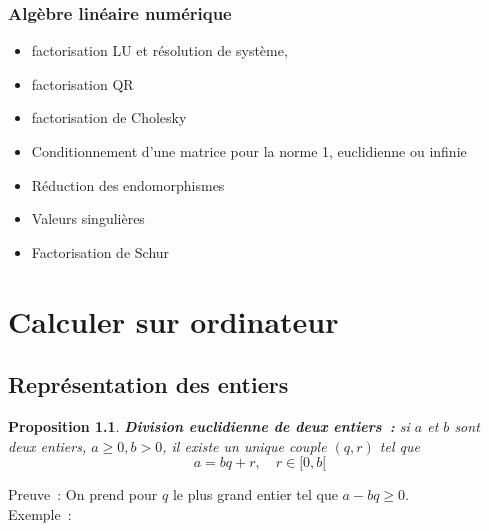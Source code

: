 \documentclass[a4paper,11pt]{book}
\newtheorem{prop}[thm]{Proposition}
\begin{document}
\begin{giacjshere}
\subsection{Alg\`ebre lin\'eaire num\'erique}
\begin{itemize}
\item factorisation LU et r\'esolution de syst\`eme,
\item factorisation QR
\item factorisation de Cholesky
\item Conditionnement d'une matrice pour la norme 1, euclidienne ou infinie
\item R\'eduction des endomorphismes
\item Valeurs singuli\`eres
\item Factorisation de Schur
\end{itemize}

\chapter{Calculer sur ordinateur} \label{sec:calculer}

\section{Représentation des entiers}

\begin{prop}
{\bf Division euclidienne de deux entiers~:} si $a$ et $b$ sont
deux entiers, $a \geq 0, b>0$, il existe un unique couple $(q,r)$ tel que
\[ a = bq +r , \quad r \in [0, b[ \]
\end{prop}
Preuve~: On prend pour $q$ le plus grand entier tel que $a-bq \geq 0$.\\
Exemple~: 


\end{giacjshere}
\end{document}
